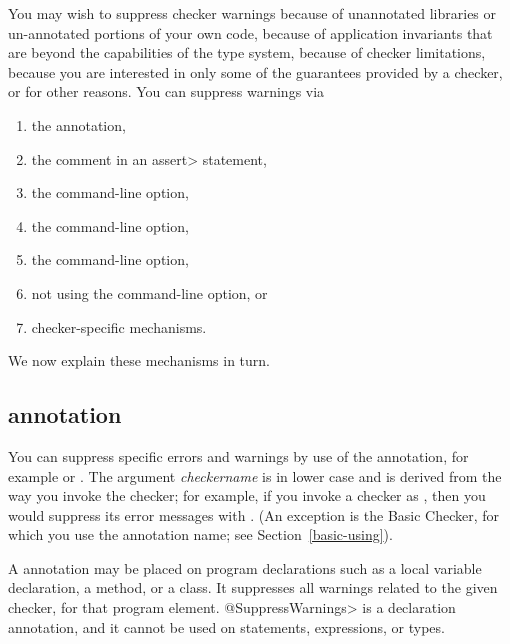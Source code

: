 You may wish to suppress checker warnings because of unannotated libraries
or un-annotated portions of your own code, because of application
invariants that are beyond the capabilities of the type system, because of
checker limitations, because you are interested in only some of the
guarantees provided by a checker, or for other reasons.  You can suppress
warnings via
\begin{enumerate}
\item
  the  annotation,
\item
  the  comment in an \<assert> statement,
\item
  the  command-line option,
\item
  the  command-line option,
\item
  the  command-line option,
\item
  not using the  command-line option, or
\item
  checker-specific mechanisms.
\end{enumerate}

\noindent
We now explain these mechanisms in turn.


\subsection{ annotation\label{suppresswarnings-annotation}}

You can suppress specific errors and warnings by use of the
 annotation, for example
 or .
The argument \emph{checkername} is in lower case and is derived from the
way you invoke the checker; for example, if you invoke a checker as
, then you would suppress its
error messages with .  (An exception is
the Basic Checker, for which you use the annotation name; see
Section~\ref{basic-using}).

A 
annotation may be placed on program declarations such as a local
variable declaration, a method, or a class.  It suppresses all warnings
related to the given checker, for that program element.
\<@SuppressWarnings> is a declaration annotation, and it cannot be used on
statements, expressions, or types.

